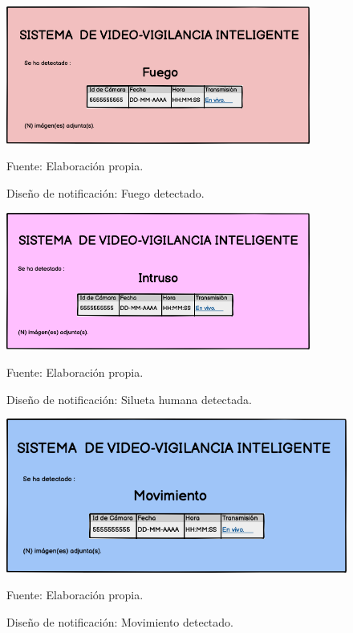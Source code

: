 \begin{figure}[H]
    \begin{center}
        \includegraphics[width=10cm]{img/capitulo_4/fire_detection_mail.png}
    \end{center}
    \begin{center}
        \caption{Diseño de notificación: Fuego detectado.}
        Fuente: Elaboración propia.
        \label{fig:desing_fire_detection_notif}        
    \end{center}
\end{figure}

\begin{figure}[H]
    \begin{center}
        \includegraphics[width=10cm]{img/capitulo_4/human_detection_mail.png}
    \end{center}
    \begin{center}
        \caption{Diseño de notificación: Silueta humana detectada.}
        Fuente: Elaboración propia.
        \label{fig:desing_human_detection_notif}
    \end{center}
\end{figure}

\begin{figure}[H]
    \begin{center}
        \includegraphics[width=10prcm]{img/capitulo_4/movement_detection_mail.png}
    \end{center}
    \begin{center}
        \caption{Diseño de notificación: Movimiento detectado.}
        Fuente: Elaboración propia.
        \label{fig:desing_motion_detection_notif}
    \end{center}
\end{figure}


